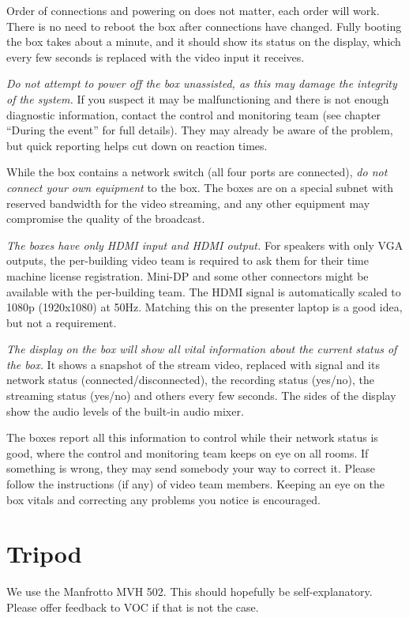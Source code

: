 \documentclass{article}
\begin{document}
Order of connections and powering on does not matter, each order will work. There is no need to reboot the box after connections have changed.
Fully booting the box takes about a minute, and it should show its status on the display, which every few seconds is replaced with the video input it receives.

\emph{Do not attempt to power off the box unassisted, as this may damage the integrity of the system.}
If you suspect it may be malfunctioning and there is not enough diagnostic information, contact the control and monitoring team (see chapter ``During the event'' for full details). They may already be aware of the problem, but quick reporting helps cut down on reaction times.

While the box contains a network switch (all four ports are connected), \emph{do not connect your own equipment} to the box. The boxes are on a special subnet with reserved bandwidth for the video streaming, and any other equipment may compromise the quality of the broadcast.

\emph{The boxes have only HDMI input and HDMI output.}
For speakers with only VGA outputs, the per-building video team is required to ask them for their time machine license registration. Mini-DP and some other connectors might be available with the per-building team.
The HDMI signal is automatically scaled to 1080p (1920x1080) at 50Hz. Matching this on the presenter laptop is a good idea, but not a requirement.

\emph{The display on the box will show all vital information about the current status of the box.} It shows a snapshot of the stream video, replaced with signal and its network status (connected/disconnected), the recording status (yes/no), the streaming status (yes/no) and others every few seconds. The sides of the display show the audio levels of the built-in audio mixer.

The boxes report all this information to control while their network status is good, where the control and monitoring team keeps on eye on all rooms. If something is wrong, they may send somebody your way to correct it. Please follow the instructions (if any) of video team members. Keeping an eye on the box vitals and correcting any problems you notice is encouraged.

\section{Tripod}
We use the Manfrotto MVH 502. This should hopefully be self-explanatory. Please offer feedback to VOC if that is not the case.
\end{document}
